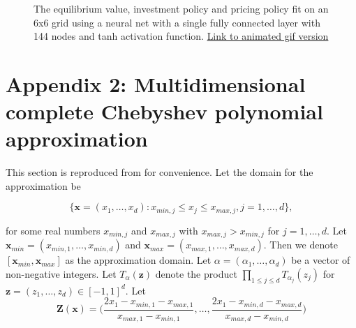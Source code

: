 \documentclass[12pt]{article}
\begin{document}
\begin{figure}[H]
  \centering
  \caption{The equilibrium value, investment policy and pricing policy fit on an 6x6 grid using a neural net with a single fully connected layer with 144 nodes and tanh activation function. \href{https://github.com/wmjones/VFA-for-dynamic-games/blob/master/gifs/gif_ann_6.gif}{Link to animated gif version}}
\end{figure}

\section*{Appendix 2: Multidimensional complete Chebyshev polynomial approximation}
\label{multicheb}

This section is reproduced from \citet{2015_Judd_Cai} for convenience. Let the domain for the approximation be

\begin{equation*}
  \{\boldsymbol{x}=(x_1,\dots,x_d):x_{min,j}\leq x_j \leq x_{max,j}, j=1,\dots,d \},
\end{equation*}

for some real numbers $x_{min,j}$ and $x_{max,j}$ with $x_{max,j} > x_{min,j}$ for $j=1,\dots,d$. Let $\boldsymbol{x}_{min}=(x_{min,1},\dots,x_{min,d})$ and $\boldsymbol{x}_{max}=(x_{max,1},\dots,x_{max,d})$. Then we denote $[\boldsymbol{x}_{min},\boldsymbol{x}_{max}]$ as the approximation domain. Let $\alpha=(\alpha_1,\dots,\alpha_d)$ be a vector of non-negative integers. Let $T_\alpha(\boldsymbol{z})$ denote the product $\prod_{1\leq j \leq d} T_{\alpha_j}(z_j)$ for $\boldsymbol{z}=(z_1,\dots,z_d) \in [-1,1]^d$. Let
\begin{equation*}
  \boldsymbol{Z}(\boldsymbol{x})=\bigg( \frac{2x_1-x_{min,1}-x_{max,1}}{x_{max,1}-x_{min,1}},\dots,\frac{2x_1-x_{min,d}-x_{max,d}}{x_{max,d}-x_{min,d}} \bigg)
\end{equation*}
\end{document}
